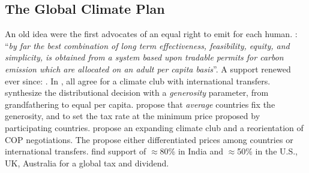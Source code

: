 \documentclass[aspectratio=169,xcolor=dvipsnames, 11pt,mathserif]{beamer}
\begin{document}
\begin{framefont}{\small}
\section{The Global Climate Plan}

\begin{frame}{An old idea}
    \bbvsp \ip {} were the first advocates of an equal right to emit for each human. 
    \ip {}: ``\textit{by far the best combination of long term effectiveness, feasibility, equity, and simplicity, is obtained from a system based upon tradable permits for carbon emission which are allocated on an adult per capita basis}''.
    \ip A support renewed ever since: . 
    \ip In , all agree for a climate club with international transfers.
    \ip {} synthesize the distributional decision with a \textit{generosity} parameter, from grandfathering to equal per capita. %
    \ip {} propose that \textit{average} countries fix the generosity, and to set the tax rate at the minimum price proposed by participating countries. %
    \ip {} propose an expanding climate club and a reorientation of COP negotiations. %
    \ip The  propose either differentiated prices among countries or international transfers. %
    \ip {} find support of $\approx$80\% in India and $\approx$50\% in the U.S., UK, Australia for a global tax and dividend.
    \ee
\end{frame}


\end{framefont}
\end{document}
